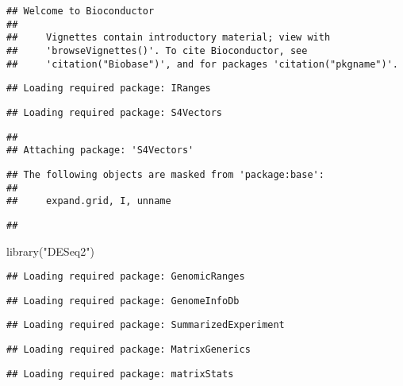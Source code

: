 \documentclass[
]{article}
\newenvironment{Shaded}{\begin{snugshade}}{\end{snugshade}}
\newcommand{\FunctionTok}[1]{\textcolor[rgb]{0.00,0.00,0.00}{#1}}
\newcommand{\NormalTok}[1]{#1}
\newcommand{\StringTok}[1]{\textcolor[rgb]{0.31,0.60,0.02}{#1}}
\begin{document}
\begin{verbatim}
## Welcome to Bioconductor
## 
##     Vignettes contain introductory material; view with
##     'browseVignettes()'. To cite Bioconductor, see
##     'citation("Biobase")', and for packages 'citation("pkgname")'.
\end{verbatim}

\begin{verbatim}
## Loading required package: IRanges
\end{verbatim}

\begin{verbatim}
## Loading required package: S4Vectors
\end{verbatim}

\begin{verbatim}
## 
## Attaching package: 'S4Vectors'
\end{verbatim}

\begin{verbatim}
## The following objects are masked from 'package:base':
## 
##     expand.grid, I, unname
\end{verbatim}

\begin{verbatim}
## 
\end{verbatim}

\begin{Shaded}
\begin{Highlighting}[]
\FunctionTok{library}\NormalTok{(}\StringTok{"DESeq2"}\NormalTok{)}
\end{Highlighting}
\end{Shaded}

\begin{verbatim}
## Loading required package: GenomicRanges
\end{verbatim}

\begin{verbatim}
## Loading required package: GenomeInfoDb
\end{verbatim}

\begin{verbatim}
## Loading required package: SummarizedExperiment
\end{verbatim}

\begin{verbatim}
## Loading required package: MatrixGenerics
\end{verbatim}

\begin{verbatim}
## Loading required package: matrixStats
\end{verbatim}
\end{document}
